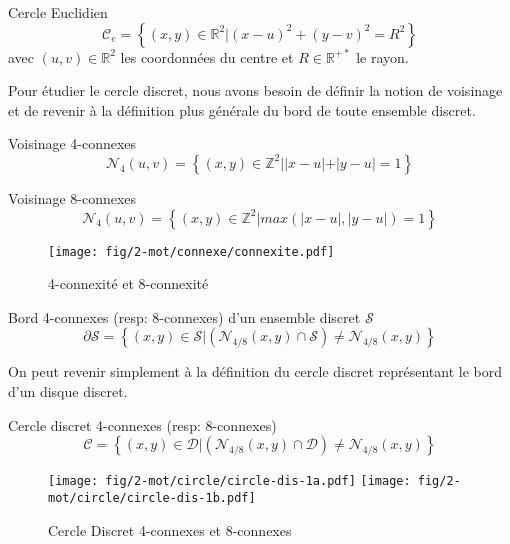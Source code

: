 \begin{Definition}{Cercle Euclidien}
\label{def:cer-euc}
  $$\mathcal{C}_e =  \left\{ (x,y) \in \mathbb{R}^{2} |  (x - u)^2 + (y - v)^2 = R^2 \right\}$$
  avec $(u,v) \in \mathbb{R}^{2}$ les coordonnées du centre et $R \in \mathbb{R}^{+*}$ le rayon.\\
\end{Definition}

Pour étudier le cercle discret, nous avons besoin de définir la notion de voisinage et de revenir à la définition plus générale du bord de toute ensemble discret.\\

\begin{Definition}{Voisinage 4-connexes}
\label{def:vois-4}
  $$\mathcal{N}_4(u,v) =  \left\{ (x,y) \in \mathbb{Z}^{2} |  |x-u|+|y-u| = 1 \right\}$$
\end{Definition}

\begin{Definition}{Voisinage 8-connexes}
\label{def:vois-8}
  $$\mathcal{N}_4(u,v) =  \left\{ (x,y) \in \mathbb{Z}^{2} |  max(|x-u|,|y-u|) = 1 \right\}$$
\end{Definition}

\begin{figure}[H]
  \centering
  \texttt{[image: fig/2-mot/connexe/connexite.pdf]}
  \caption{4-connexité et 8-connexité}
\end{figure}

\begin{Definition}{Bord 4-connexes (resp: 8-connexes) d'un ensemble discret $\mathcal{S}$}
\label{def:bord-ens}
  $$ \partial \mathcal{S} =  \left\{ (x,y) \in \mathcal{S} | \left( \mathcal{N}_{4/8}(x,y) \cap \mathcal{S} \right) \neq \mathcal{N}_{4/8}(x,y) \right\}$$
\end{Definition}

On peut revenir simplement à la définition du cercle discret représentant le bord d'un disque discret.

\begin{Definition}{Cercle discret 4-connexes (resp: 8-connexes)}
\label{def:cer-dis}
  $$ \mathcal{C} =  \left\{ (x,y) \in \mathcal{D} | \left( \mathcal{N}_{4/8}(x,y) \cap \mathcal{D} \right) \neq \mathcal{N}_{4/8}(x,y) \right\}$$
\end{Definition}

\begin{figure}[H]
  \centering
  \texttt{[image: fig/2-mot/circle/circle-dis-1a.pdf]}
  \texttt{[image: fig/2-mot/circle/circle-dis-1b.pdf]}
  \caption{Cercle Discret 4-connexes et 8-connexes}
\end{figure}


